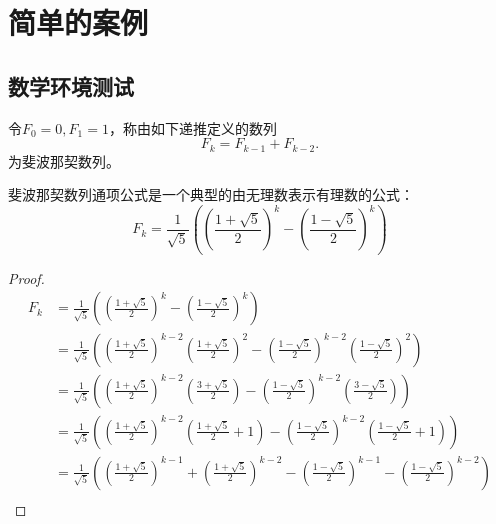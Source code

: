 \section{简单的案例}

\subsection{数学环境测试}

\begin{definition}[菲波那切数列]
    令$F_0=0,F_1=1$，称由如下递推定义的数列
    \begin{equation}
        F_k = F_{k-1} + F_{k-2}.
    \end{equation}
    为斐波那契数列。
\end{definition}

\begin{theorem}[斐波那契的通项公式]
    斐波那契数列通项公式是一个典型的由无理数表示有理数的公式：
    \begin{equation}
        F_k=\frac{1}{\sqrt{5}}\left( \left( \frac{1+\sqrt{5}}{2} \right) ^k-\left( \frac{1-\sqrt{5}}{2} \right) ^k \right) 
    \end{equation}
    \begin{proof}
        \begin{equation}
            \begin{aligned}
                F_k&=\frac{1}{\sqrt{5}}\left( \left( \frac{1+\sqrt{5}}{2} \right) ^k-\left( \frac{1-\sqrt{5}}{2} \right) ^k \right)\\
                &=\frac{1}{\sqrt{5}}\left( \left( \frac{1+\sqrt{5}}{2} \right) ^{k-2}\left( \frac{1+\sqrt{5}}{2} \right) ^2-\left( \frac{1-\sqrt{5}}{2} \right) ^{k-2}\left( \frac{1-\sqrt{5}}{2} \right) ^2 \right)\\
                &=\frac{1}{\sqrt{5}}\left( \left( \frac{1+\sqrt{5}}{2} \right) ^{k-2}\left( \frac{3+\sqrt{5}}{2} \right) -\left( \frac{1-\sqrt{5}}{2} \right) ^{k-2}\left( \frac{3-\sqrt{5}}{2} \right) \right)\\
                &=\frac{1}{\sqrt{5}}\left( \left( \frac{1+\sqrt{5}}{2} \right) ^{k-2}\left( \frac{1+\sqrt{5}}{2}+1 \right) -\left( \frac{1-\sqrt{5}}{2} \right) ^{k-2}\left( \frac{1-\sqrt{5}}{2}+1 \right) \right)\\
                &=\frac{1}{\sqrt{5}}\left( \left( \frac{1+\sqrt{5}}{2} \right) ^{k-1}+\left( \frac{1+\sqrt{5}}{2} \right) ^{k-2}-\left( \frac{1-\sqrt{5}}{2} \right) ^{k-1}-\left( \frac{1-\sqrt{5}}{2} \right) ^{k-2} \right)\\

\end{aligned}
\end{equation}
\end{proof}
\end{theorem}
